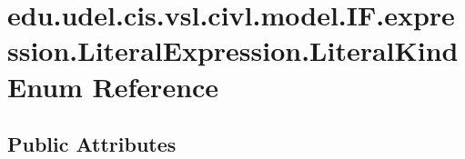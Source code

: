 \hypertarget{enumedu_1_1udel_1_1cis_1_1vsl_1_1civl_1_1model_1_1IF_1_1expression_1_1LiteralExpression_1_1LiteralKind}{}\section{edu.\+udel.\+cis.\+vsl.\+civl.\+model.\+I\+F.\+expression.\+Literal\+Expression.\+Literal\+Kind Enum Reference}
\label{enumedu_1_1udel_1_1cis_1_1vsl_1_1civl_1_1model_1_1IF_1_1expression_1_1LiteralExpression_1_1LiteralKind}
\subsection*{Public Attributes}
